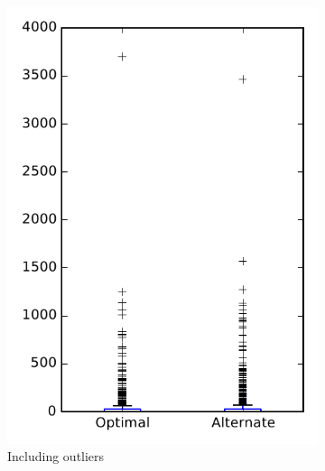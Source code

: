 
\begin{figure}
    \centering
    \begin{subfigure}{.4\textwidth}
        \centering
        \includegraphics[height=0.4\textheight]{figures/combo/flt_rq1_all}
        \caption{Including outliers}\label{fig:combo:flt:rq1:all_outlier}
    \end{subfigure}%
    \begin{subfigure}{.4\textwidth}
        \centering

\end{subfigure}
\end{figure}
